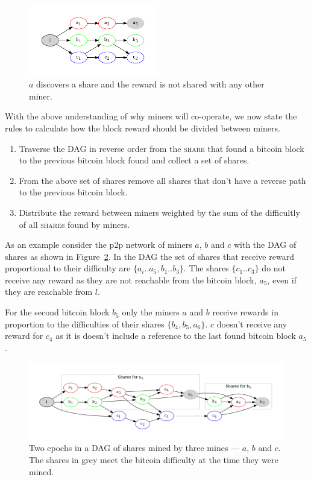 \documentclass{article}
\begin{document}
\begin{figure}
  \begin{center}
    \includegraphics[width=0.5\textwidth]{isolated-miners}
    \caption{$a$ discovers a share and the reward is not shared with any
      other miner.}\label{fig:isolated-miners}
  \end{center}    
\end{figure}

With the above understanding of why miners will co-operate, we now
state the rules to calculate how the block reward should be divided
between miners.

\begin{enumerate}
\item Traverse the DAG in reverse order from the \textsc{share} that
  found a bitcoin block to the previous bitcoin block found and
  collect a set of shares.
\item From the above set of shares remove all shares that don't have
  a reverse path to the previous bitcoin block.
\item Distribute the reward between miners weighted by the sum of
  the difficultly of all \textsc{share}s found by miners.
\end{enumerate}

As an example consider the p2p network of miners $a$, $b$ and $c$ with
the DAG of shares as shown in Figure~\ref{fig:shares-dag}. In the DAG
the set of shares that receive reward proportional to their
difficulty are $\{a_i..a_5, b_1..b_3\}$. The shares $\{c_1..c_3\}$ do
not receive any reward as they are not reachable from the bitcoin
block, $a_5$, even if they are reachable from $l$.

For the second bitcoin block $b_5$ only the miners $a$ and $b$ receive
rewards in proportion to the difficulties of their shares
$\{b_4, b_5, a_6\}$. $c$ doesn't receive any reward for $c_4$ as it is
doesn't include a reference to the last found bitcoin block $a_5$.

\begin{figure}
  \begin{center}
    \includegraphics[width=1.0\textwidth]{shares-dag}
    \caption{Two epochs in a DAG of shares mined by three mines ---
      $a$, $b$ and $c$. The shares in grey meet the bitcoin difficulty
      at the time they were mined.}\label{fig:shares-dag}
  \end{center}
\end{figure}
\end{document}

